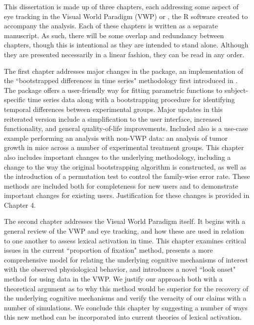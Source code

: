

This dissertation is made up of three chapters, each addressing some aspect of eye tracking in the Visual World Paradigm (VWP) or , the R software created to accompany the analysis. Each of these chapters is written as a separate manuscript. As such, there will be some overlap and redundancy between chapters, though this is intentional as they are intended to stand alone. Although they are presented necessarily in a linear fashion, they can be read in any order.

The first chapter addresses major changes in the  package, an implementation of the ``bootstrapped differences in time series" methodology first introduced in \citet{oleson2017detecting}. The package offers a user-friendly way for fitting parametric functions to subject-specific time series data along with a bootstrapping procedure for identifying temporal differences between experimental groups. Major updates in this reiterated version include a simplification to the user interface, increased functionality, and general quality-of-life improvements. Included also is a use-case example performing an analysis with non-VWP data: an analysis of tumor growth in mice across a number of experimental treatment groups. This chapter also includes important changes to the underlying methodology, including a change to the way the original bootstrapping algorithm is constructed, as well as the introduction of a permutation test to control the family-wise error rate. These methods are included both for completeness for new users and to demonstrate important changes for existing users. Justification for these changes is provided in Chapter 4. 

The second chapter addresses the Visual World Paradigm itself. It begins with a general review of the VWP and eye tracking, and how these are used in relation to one another to assess lexical activation in time. This chapter examines critical issues in the current ``proportion of fixation" method, presents a more comprehensive model for relating the underlying cognitive mechanisms of interest with the observed physiological behavior, and introduces a novel ``look onset" method for using data in the VWP. We justify our approach both with a theoretical argument as to why this method would be superior for the recovery of the underlying cognitive mechanisms and verify the veracity of our claims with a number of simulations. We conclude this chapter by suggesting a number of ways this new method can be incorporated into current theories of lexical activation.

